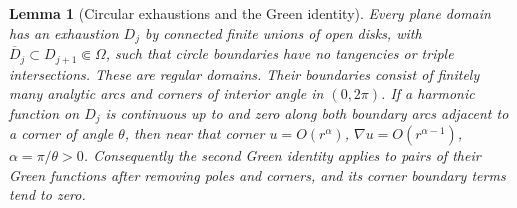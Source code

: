 \documentclass[11pt,a4paper,openany]{book}
\newtheorem{lemma}[theorem]{Lemma}
\theoremstyle{definition}
\theoremstyle{remark}\newtheorem{remark}[theorem]{Remark}
\begin{document}
\begin{lemma}[Circular exhaustions and the Green identity]\label{d12:14:circular-exhaustion}
Every plane domain has an exhaustion $D_j$ by connected finite unions of open disks, with $\overline D_j\subset D_{j+1}\Subset\Omega$, such that circle boundaries have no tangencies or triple intersections. These are regular domains. Their boundaries consist of finitely many analytic arcs and corners of interior angle in $(0,2\pi)$. If a harmonic function on $D_j$ is continuous up to and zero along both boundary arcs adjacent to a corner of angle $\theta$, then near that corner
$u=O(r^{\alpha})$, $\nabla u=O(r^{\alpha-1})$, $\alpha=\pi/\theta>0$.
Consequently the second Green identity applies to pairs of their Green functions after removing poles and corners, and its corner boundary terms tend to zero.
\end{lemma}
\end{document}
